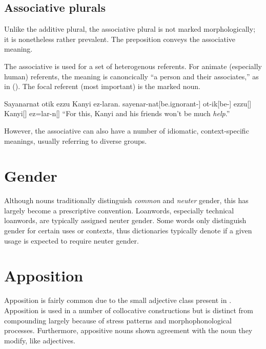 \subsection{Associative plurals}
Unlike the additive plural, the associative plural is not marked morphologically; it is nonetheless rather prevalent. The preposition  conveys the associative meaning.

The associative is used for a set of heterogenous referents. For animate (especially human) referents, the meaning is canoncically “a person and their associates,” as in (\nextx). The focal referent (\ie most important) is the marked noun.

\begin{gloss}
    \begingl
        \glpreamble Sayanarnat otik ezzu Kanyi ez-laran. \endpreamble
            sayenar-nat[be.ignorant-]
            ot-ik[be-]
            ezzu[]
            Kanyi[]
            ez=lar-n[]
        \glft “For this, Kanyi and his friends won't be much \emph{help}.”
    \endgl
\end{gloss}

However, the associative can also have a number of idiomatic, context-specific meanings, usually referring to diverse groups.


\section{Gender}
Although nouns traditionally distinguish \emph{common} and \emph{neuter} gender, this has largely become a prescriptive convention.  Loanwords, especially technical loanwords, are typically assigned neuter gender. Some words only distinguish gender for certain uses or contexts, thus dictionaries typically denote if a given usage is expected to require neuter gender.

\section{Apposition}
Apposition is fairly common due to the small adjective class present in \langname{}. Apposition is used in a number of collocative constructions but is distinct from compounding largely because of stress patterns and morphophonological processes. Furthermore, appositive nouns shown agreement with the noun they modify, like adjectives.

